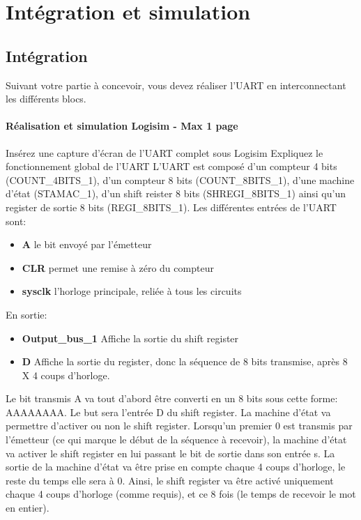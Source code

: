 \documentclass[a4paper]{article} %
\begin{document}
\section {Intégration et simulation}
\subsection{Intégration}
Suivant votre partie à concevoir, vous devez réaliser l’UART en interconnectant les différents blocs. 
\begin{tcolorbox}[colframe=Monokaimagenta,colback=white]
\paragraph{Réalisation et simulation Logisim - Max 1 page}
Insérez une capture d’écran de l’UART complet sous Logisim
Expliquez le fonctionnement global de l’UART
L'UART est composé d'un compteur 4 bits (COUNT_4BITS_1), d'un compteur 8 bits (COUNT_8BITS_1), d'une machine d'état (STAMAC_1), d'un shift reister 8 bits (SHREGI_8BITS_1) ainsi qu'un register de sortie 8 bits (REGI_8BITS_1).
Les différentes entrées de l'UART sont:
\begin{itemize}
    \item     \textbf{A} le bit envoyé par l'émetteur
    \item     \textbf{CLR} permet une remise à zéro du compteur
    \item     \textbf{sysclk} l'horloge principale, reliée à tous les circuits
\end{itemize}
En sortie:
\begin{itemize}
    \item     \textbf{Output_bus_1} Affiche la sortie du shift register
    \item     \textbf{D} Affiche la sortie du register, donc la séquence de 8 bits transmise, après 8 X 4 coups d'horloge.
\end{itemize}
Le bit transmis A va tout d'abord être converti en un 8 bits sous cette forme: AAAAAAAA. Le but sera l'entrée D du shift register.
La machine d'état va permettre d'activer ou non le shift register. Lorsqu'un premier 0 est transmis par l'émetteur (ce qui marque le début de la séquence à recevoir), la machine d'état va activer le shift register en lui passant le bit de sortie dans son entrée s. La sortie de la machine d'état va être prise en compte chaque 4 coups d'horloge, le reste du temps elle sera à 0. Ainsi, le shift register va être activé uniquement chaque 4 coups d'horloge (comme requis), et ce 8 fois (le temps de recevoir le mot en entier).

\end{tcolorbox}
\end{document}
